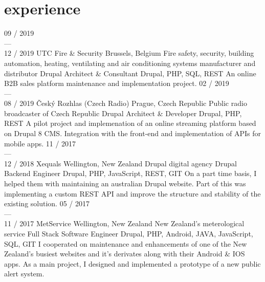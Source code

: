\documentclass[]{friggeri-cv} %
\begin{document}

\bigskip

\section{experience}
\begin{entrylist}
  \job
  {09 / 2019 \\ --- \\ 12 / 2019}
  {UTC Fire \& Security}
  {Brussels, Belgium}
  {Fire safety, security, building automation, heating, ventilating and air conditioning systems manufacturer and distributor}
  {
    \position
      {Drupal Architect \& Consultant}
      {Drupal, PHP, SQL, REST}
      {
        An online B2B sales platform maintenance and implementation project.
      }
  }
  \job
  {02 / 2019 \\ --- \\ 08 / 2019}
  {Český Rozhlas (Czech Radio)}
  {Prague, Czech Republic}
  {Public radio broadcaster of Czech Republic}
  {
    \position
      {Drupal Architect \& Developer}
      {Drupal, PHP, REST}
      {
        A pilot project and implemenation of an online streaming platform based on Drupal 8 CMS. Integration
        with the front-end and implementation of APIs for mobile apps.
      }
  }
  \job
  {11 / 2017 \\ --- \\ 12 / 2018}
  {Xequals}
  {Wellington, New Zealand}
  {Drupal digital agency}
  {
    \position
      {Drupal Backend Engineer}
      {Drupal, PHP, JavaScript, REST, GIT}
      {
        On a part time basis, I helped them with maintaining an australian Drupal website. Part of this
        was implementing a custom REST API and improve the structure and stability of the existing solution.
      }
  }
  \job
  {05 / 2017 \\ --- \\ 11 / 2017}
  {MetService}
  {Wellington, New Zealand}
  {New Zealand's meterological service}
  {
    \position
      {Full Stack Software Engineer}
      {Drupal, PHP, Android, JAVA, JavaScript, SQL, GIT}
      {
        I cooperated on maintenance and enhancements of one of the New Zealand's busiest websites and it's derivates along with their Android \& IOS apps.
        As a main project, I designed and implemented a prototype of a new public alert system.
      }
  }
\end{entrylist}
\end{document}
